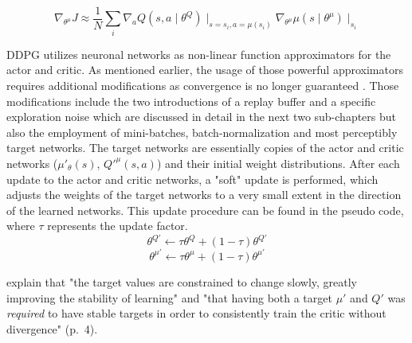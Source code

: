 \begin{equation*}
                    \nabla_{\theta^\mu} J \approx \frac{1}{N}
                    \sum_i{\nabla_a Q(s, a \mid \theta^Q) 
                    \mid_{s = s_i, a=\mu(s_i)} \nabla_{\theta^\mu} \mu(s \mid \theta^\mu) \mid_{s_i}}
\end{equation*}
\par
DDPG utilizes neuronal networks as non-linear function approximators for the actor and critic. As mentioned earlier, the usage of those powerful approximators requires additional modifications as convergence is no longer guaranteed \cite[p.3]{lillicrap2019continuous}. Those modifications include the two introductions of a replay buffer and a specific exploration noise which are discussed in detail in the next two sub-chapters but also the employment of mini-batches, batch-normalization and most perceptibly target networks. The target networks are essentially copies of the actor and critic networks ($\mu'_\theta(s)$, $Q'^\mu(s,a)$) and their initial weight distributions. After each update to the actor and critic networks, a "soft" update is performed, which adjusts the weights of the target networks to a very small extent in the direction of the learned networks. This update procedure can be found in the pseudo code, where $\tau$ represents the update factor.
    \begin{equation*}
                    \theta^{Q'} \leftarrow \tau \theta^Q
 + (1- \tau) \theta^{Q'}                \end{equation*}
 \begin{equation*}
                    \theta^{\mu'} \leftarrow \tau \theta^\mu
 + (1- \tau) \theta^{\mu'}                
 \end{equation*}


\cite{lillicrap2019continuous} explain that "the target values are constrained to change slowly, greatly improving the stability of learning" and "that having both a target $\mu'$ and $Q'$ was \textit{required} to have stable targets in order to consistently train the critic without divergence" (p.~4).